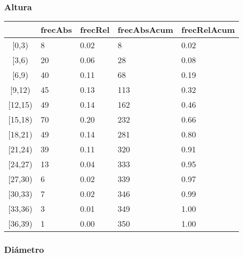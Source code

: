 \documentclass[titlepage, 12pt]{article}
\begin{document}
\subsubsection{Altura}

\begin{table}[H]
  \begin{tabularx}{\textwidth}{|c|X|X|X|X|}
    \hline
            & frecAbs & frecRel & frecAbsAcum & frecRelAcum \\ \hline
    [0,3)   & 8       & 0.02    & 8           & 0.02        \\ \hline
    [3,6)   & 20      & 0.06    & 28          & 0.08        \\ \hline
    [6,9)   & 40      & 0.11    & 68          & 0.19        \\ \hline
    [9,12)  & 45      & 0.13    & 113         & 0.32        \\ \hline
    [12,15) & 49      & 0.14    & 162         & 0.46        \\ \hline
    [15,18) & 70      & 0.20    & 232         & 0.66        \\ \hline
    [18,21) & 49      & 0.14    & 281         & 0.80        \\ \hline
    [21,24) & 39      & 0.11    & 320         & 0.91        \\ \hline
    [24,27) & 13      & 0.04    & 333         & 0.95        \\ \hline
    [27,30) & 6       & 0.02    & 339         & 0.97        \\ \hline
    [30,33) & 7       & 0.02    & 346         & 0.99        \\ \hline
    [33,36) & 3       & 0.01    & 349         & 1.00        \\ \hline
    [36,39) & 1       & 0.00    & 350         & 1.00        \\ \hline
  \end{tabularx}
\end{table}

\subsubsection{Diámetro}
\end{document}
